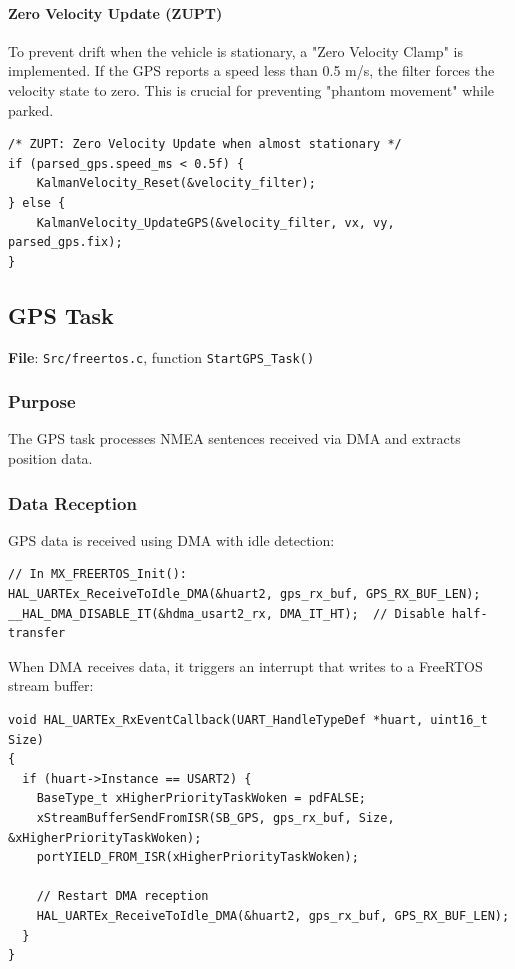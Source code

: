 \documentclass[11pt,a4paper]{article}
\begin{document}
\paragraph{Zero Velocity Update (ZUPT)}
To prevent drift when the vehicle is stationary, a "Zero Velocity Clamp" is implemented. If the GPS reports a speed less than 0.5 m/s, the filter forces the velocity state to zero. This is crucial for preventing "phantom movement" while parked.

\begin{lstlisting}[caption=Kalman Filter ZUPT Logic, label=lst:kalmanzupt]
/* ZUPT: Zero Velocity Update when almost stationary */
if (parsed_gps.speed_ms < 0.5f) {
    KalmanVelocity_Reset(&velocity_filter);
} else {
    KalmanVelocity_UpdateGPS(&velocity_filter, vx, vy, parsed_gps.fix);
}
\end{lstlisting}

\subsection{GPS Task}
\textbf{File}: \texttt{Src/freertos.c}, function \texttt{StartGPS\_Task()}

\subsubsection{Purpose}
The GPS task processes NMEA sentences received via DMA and extracts position data.

\subsubsection{Data Reception}
GPS data is received using DMA with idle detection:

\begin{lstlisting}[caption=GPS DMA Reception Setup, label=lst:gpsdma]
// In MX_FREERTOS_Init():
HAL_UARTEx_ReceiveToIdle_DMA(&huart2, gps_rx_buf, GPS_RX_BUF_LEN);
__HAL_DMA_DISABLE_IT(&hdma_usart2_rx, DMA_IT_HT);  // Disable half-transfer
\end{lstlisting}

When DMA receives data, it triggers an interrupt that writes to a FreeRTOS stream buffer:

\begin{lstlisting}[caption=GPS DMA Callback, label=lst:gpscallback]
void HAL_UARTEx_RxEventCallback(UART_HandleTypeDef *huart, uint16_t Size)
{
  if (huart->Instance == USART2) {
    BaseType_t xHigherPriorityTaskWoken = pdFALSE;
    xStreamBufferSendFromISR(SB_GPS, gps_rx_buf, Size, &xHigherPriorityTaskWoken);
    portYIELD_FROM_ISR(xHigherPriorityTaskWoken);
    
    // Restart DMA reception
    HAL_UARTEx_ReceiveToIdle_DMA(&huart2, gps_rx_buf, GPS_RX_BUF_LEN);
  }
}
\end{lstlisting}
\end{document}
